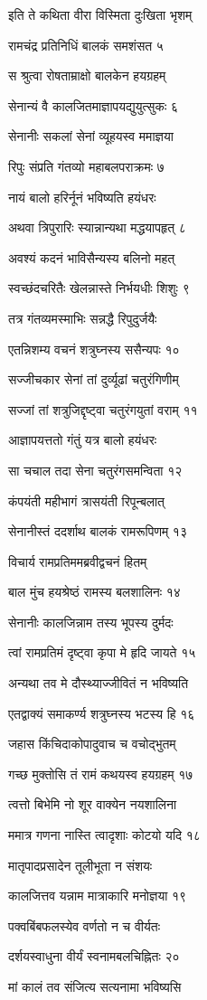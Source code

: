 इति ते कथिता वीरा विस्मिता दुःखिता भृशम्

रामचंद्र प्रतिनिधिं बालकं समशंसत ५

स श्रुत्वा रोषताम्राक्षो बालकेन हयग्रहम्

सेनान्यं वै कालजितमाज्ञापयद्युयुत्सुकः ६

सेनानीः सकलां सेनां व्यूहयस्व ममाज्ञया

रिपुः संप्रति गंतव्यो महाबलपराक्रमः ७

नायं बालो हरिर्नूनं भविष्यति हयंधरः

अथवा त्रिपुरारिः स्यान्नान्यथा मद्धयापहृत् ८

अवश्यं कदनं भाविसैन्यस्य बलिनो महत्

स्वच्छंदचरितैः खेलन्नास्ते निर्भयधीः शिशुः ९

तत्र गंतव्यमस्माभिः सन्नद्धै रिपुदुर्जयैः

एतन्निशम्य वचनं शत्रुघ्नस्य ससैन्यपः १०

सज्जीचकार सेनां तां दुर्व्यूढां चतुरंगिणीम्

सज्जां तां शत्रुजिद्दृष्ट्वा चतुरंगयुतां वराम् ११

आज्ञापयत्ततो गंतुं यत्र बालो हयंधरः

सा चचाल तदा सेना चतुरंगसमन्विता १२

कंपयंती महीभागं त्रासयंती रिपून्बलात्

सेनानीस्तं ददर्शाथ बालकं रामरूपिणम् १३

विचार्य रामप्रतिममब्रवीद्वचनं हितम्

बाल मुंच हयश्रेष्ठं रामस्य बलशालिनः १४

सेनानीः कालजिन्नाम तस्य भूपस्य दुर्मदः

त्वां रामप्रतिमं दृष्ट्वा कृपा मे हृदि जायते १५

अन्यथा तव मे दौस्थ्याज्जीवितं न भविष्यति

एतद्वाक्यं समाकर्ण्य शत्रुघ्नस्य भटस्य हि १६

जहास किंचिदाकोपादुवाच च वचोद्भुतम्

गच्छ मुक्तोसि तं रामं कथयस्व हयग्रहम् १७

त्वत्तो बिभेमि नो शूर वाक्येन नयशालिना

ममात्र गणना नास्ति त्वादृशाः कोटयो यदि १८

मातृपादप्रसादेन तूलीभूता न संशयः

कालजित्तव यन्नाम मात्राकारि मनोज्ञया १९

पक्वबिंबफलस्येव वर्णतो न च वीर्यतः

दर्शयस्वाधुना वीर्यं स्वनामबलचिह्नितः २०

मां कालं तव संजित्य सत्यनामा भविष्यसि

